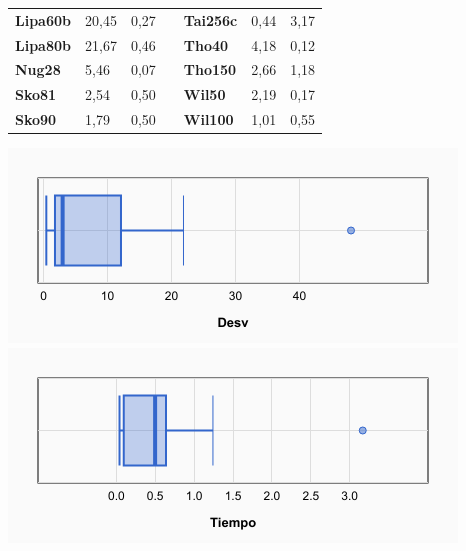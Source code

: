 \documentclass[a4paper, 12pt]{article}
\begin{document}
\begin{table}[H]
\begin{tabular}{|l|l|l|l|l|l|l|}
\textbf{Lipa60b}                    & 20,45                              & 0,27                                 &                                & \textbf{Tai256c}                   & 0,44                               & 3,17                                 \\ \cline{1-3} \cline{5-7} 
\textbf{Lipa80b}                    & 21,67                              & 0,46                                 &                                & \textbf{Tho40}                     & 4,18                               & 0,12                                 \\ \cline{1-3} \cline{5-7} 
\textbf{Nug28}                      & 5,46                               & 0,07                                 &                                & \textbf{Tho150}                    & 2,66                               & 1,18                                 \\ \cline{1-3} \cline{5-7} 
\textbf{Sko81}                      & 2,54                               & 0,50                                 &                                & \textbf{Wil50}                     & 2,19                               & 0,17                                 \\ \cline{1-3} \cline{5-7} 
\textbf{Sko90}                      & 1,79                               & 0,50                                 &                                & \textbf{Wil100}                    & 1,01                               & 0,55                                 \\ \cline{1-3} \cline{5-7} 
\end{tabular}
\end{table}

\begin{center}
         \includegraphics[scale=0.42]{boxplot-am(1-01mej)-desv}
         \includegraphics[scale=0.42]{boxplot-am(1-01mej)-time}
      \end{center}
      
\end{document}
